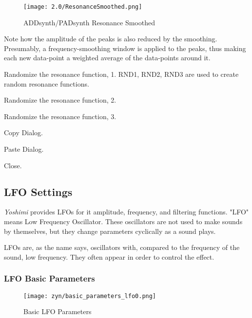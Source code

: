 \begin{figure}[H]
   \centering
   \texttt{[image: 2.0/ResonanceSmoothed.png]}
   \caption{ADDsynth/PADsynth Resonance Smoothed}
   \label{fig:addsynth_resonance_smoothed}
\end{figure}

   Note how the amplitude of the peaks is also reduced by the smoothing.
   Presumably, a frequency-smoothing window is applied to the peaks, thus making
   each new data-point a weighted average of the data-points around it.

   Randomize the resonance function, 1.
   RND1, RND2, RND3 are used to create random resonance functions.

   Randomize the resonance function, 2.

   Randomize the resonance function, 3.

   Copy Dialog.

   Paste Dialog.

   Close.

\subsection{LFO Settings}
\label{subsec:lfo_settings}

   \textsl{Yoshimi} provides LFOs for it amplitude, frequency, and filtering
   functions.
   "LFO" means Low Frequency Oscillator. These oscillators are not used to make
   sounds by themselves, but they change parameters cyclically as a sound
   plays.

   LFOs are, as the name says, oscillators with, compared to the frequency of
   the sound, low frequency. They often appear in order to control the
   effect.

\subsubsection{LFO Basic Parameters}
\label{subsubsec:lfo_basic_parameters}

\begin{figure}[H]
   \centering
   \texttt{[image: zyn/basic\_parameters\_lfo0.png]}
   \caption[Basic LFO Parameters]{Basic LFO Parameters}
   \label{fig:basic_parameters_lfo}
\end{figure}

